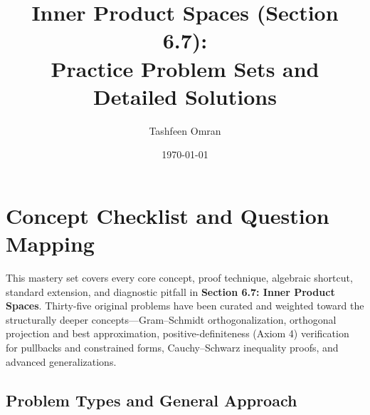\documentclass[11pt, letterpaper]{article}
\title{Inner Product Spaces (Section 6.7):\\Practice Problem Sets and Detailed Solutions}
\author{Tashfeen Omran}
\date{\today}
\theoremstyle{definition}
\theoremstyle{remark}
\begin{document}
\maketitle
\tableofcontents
\newpage

\section{Concept Checklist and Question Mapping}

This mastery set covers every core concept, proof technique, algebraic shortcut, standard extension, and diagnostic pitfall in \textbf{Section 6.7: Inner Product Spaces}. Thirty-five original problems have been curated and weighted toward the structurally deeper concepts—Gram--Schmidt orthogonalization, orthogonal projection and best approximation, positive-definiteness (Axiom 4) verification for pullbacks and constrained forms, Cauchy--Schwarz inequality proofs, and advanced generalizations.

\subsection{Problem Types and General Approach}
\end{document}

